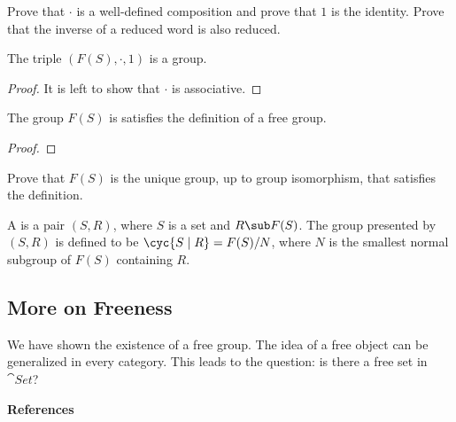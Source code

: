 \documentclass[10pt]{article}
\begin{document}
\begin{problem}
    Prove that $\cdot$ is a well-defined composition and prove that $1$ is the identity. Prove that the inverse of a reduced word is also reduced.
\end{problem}
\begin{proposition}
    The triple $(F(S),\cdot,1)$ is a group.
\end{proposition}
\begin{proof}
    It is left to show that $\cdot$ is associative. 
\end{proof}

\begin{proposition}
    The group $F(S)$ is satisfies the definition of a free group.
\end{proposition}
\begin{proof}
    
\end{proof}
\begin{problem}
    Prove that $F(S)$ is the unique group, up to group isomorphism, that satisfies the definition.
\end{problem}
\begin{definition}
    A  is a pair $(S,R)$, where $S$ is a set and $R\sub F(S)$. The group presented by $(S,R)$ is defined to be $\cyc{S\mid R}=F(S)/N$, where $N$ is the smallest normal subgroup of $F(S)$ containing $R$.
\end{definition}
\subsection{More on Freeness}
\par
We have shown the existence of a free group. The idea of a free object can be generalized in every category. This leads to the question: is there a free set in $\cat{Set}$?


\vspace{\baselineskip}
\begin{center}
    \large\bfseries References\normalsize
\end{center}
\hindex 
\end{document}
